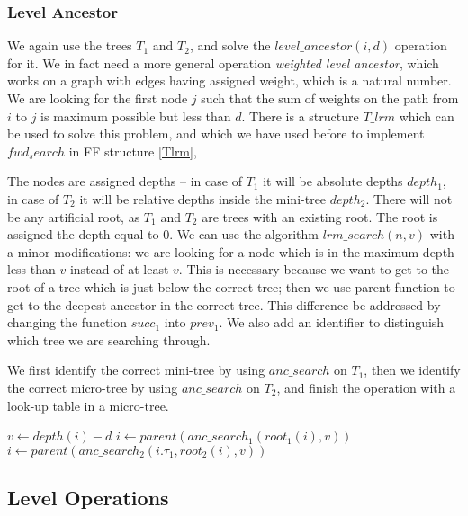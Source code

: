 \subsubsection{Level Ancestor}

We again use the trees $T_1$ and $T_2$, and solve the $level\_ancestor(i, d)$ operation for it.
We in fact need a more general operation \emph{weighted level ancestor}, which works on a graph with edges having assigned weight, which is a natural number.
We are looking for the first node $j$ such that the sum of weights on the path from $i$ to $j$ is maximum possible but less than $d$.
There is a structure $T\_{lrm}$ which can be used to solve this problem, and which we have used before to implement $fwd_search$ in FF structure \ref{Tlrm},

The nodes are assigned depths -- in case of $T_1$ it will be absolute depths $depth_1$, in case of $T_2$ it will be relative depths inside the mini-tree $depth_2$.
There will not be any artificial root, as $T_1$ and $T_2$ are trees with an existing root.
The root is assigned the depth equal to $0$.
We can use the algorithm $lrm\_search(n, v)$ with a minor modifications: we are looking for a node which is in the maximum depth less than $v$ instead of at least $v$.
This is necessary because we want to get to the root of a tree which is just below the correct tree; then we use parent function to get to the deepest ancestor in the correct tree.
This difference be addressed by changing the function $succ_1$ into $prev_1$.
We also add an identifier to distinguish which tree we are searching through.

We first identify the correct mini-tree by using $anc\_search$ on $T_1$, then we identify the correct micro-tree by using $anc\_search$ on $T_2$, and finish the operation with a look-up table in a micro-tree.

\begin{algorithmic}
	\State $v \gets depth(i) - d$
		\State {}
	\EndIf
	 
		\State $i \gets parent(anc\_search_1(root_1(i), v))$
	\EndIf
	 
		\State $i \gets parent(anc\_search_2(i.\tau_1, root_2(i), v))$
	\EndIf
	\State {}
\EndFunction
\end{algorithmic}

\subsection{Level Operations}

